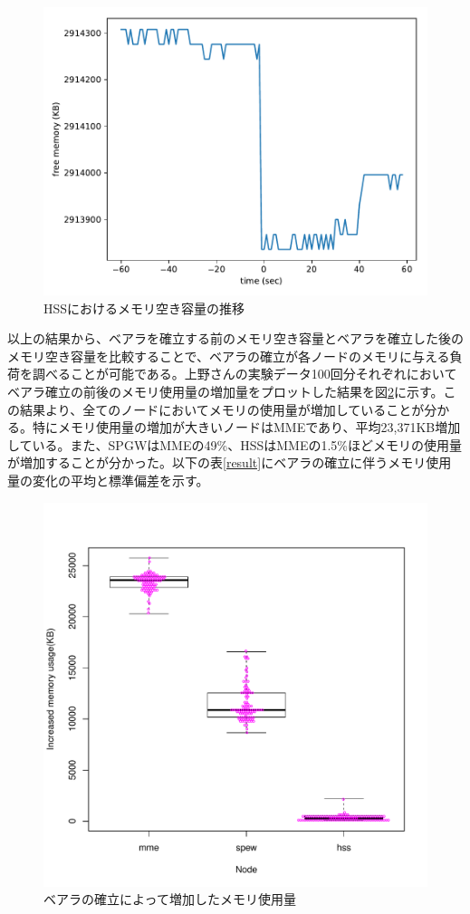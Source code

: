 \documentclass[a4j]{ujarticle}
\begin{document}
\begin{figure}[htbp]
	\centering
	\includegraphics[width=0.7\hsize]{hssMemory.pdf}
  \caption{HSSにおけるメモリ空き容量の推移}
	\label{hssMemory}
\end{figure}
\clearpage
以上の結果から、ベアラを確立する前のメモリ空き容量とベアラを確立した後のメモリ空き容量を比較することで、ベアラの確立が各ノードのメモリに与える負荷を調べることが可能である。上野さんの実験データ100回分それぞれにおいてベアラ確立の前後のメモリ使用量の増加量をプロットした結果を図\ref{all_boxplot}に示す。この結果より、全てのノードにおいてメモリの使用量が増加していることが分かる。特にメモリ使用量の増加が大きいノードはMMEであり、平均23,371KB増加している。また、SPGWはMMEの49\%、HSSはMMEの1.5\%ほどメモリの使用量が増加することが分かった。以下の表\ref{result}にベアラの確立に伴うメモリ使用量の変化の平均と標準偏差を示す。

\begin{figure}[htbp]
	\centering
	\includegraphics[width=0.7\hsize]{all_boxplot.pdf}
  \caption{ベアラの確立によって増加したメモリ使用量}
	\label{all_boxplot}
\end{figure}
\end{document}
